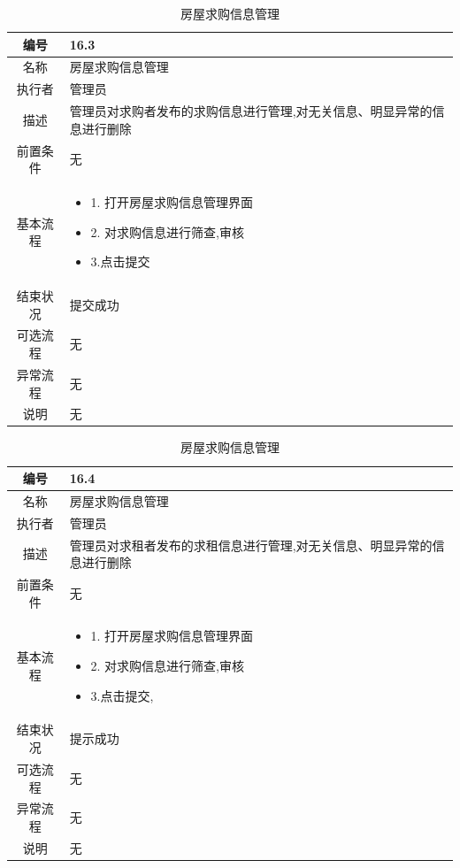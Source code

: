\begin{table}[htbp]
	\centering
	\begin{tabular}{|c|p{11cm}|}
        \hline
        编号 & 16.3 \\
        \hline
        名称 & 房屋求购信息管理 \\ 
        \hline
        执行者 & 管理员 \\
        \hline
        描述 & 管理员对求购者发布的求购信息进行管理,对无关信息、明显异常的信息进行删除 \\
        \hline
        前置条件 & 无 \\
        \hline
        基本流程 & \begin{itemize}
            \item 1. 打开房屋求购信息管理界面
            \item  2. 对求购信息进行筛查,审核
            \item  3.点击提交
        \end{itemize} \\
        \hline
        结束状况 & 提交成功 \\
        \hline
        可选流程 & 无 \\
        \hline
        异常流程 & 无 \\
        \hline
        说明 & 无 \\
        \hline
    \end{tabular}
    \caption{房屋求购信息管理}
\end{table}

\begin{table}[htbp]
	\centering
	\begin{tabular}{|c|p{11cm}|}
        \hline
        编号 & 16.4 \\
        \hline
        名称 & 房屋求购信息管理 \\ 
        \hline
        执行者 & 管理员 \\
        \hline
        描述 & 管理员对求租者发布的求租信息进行管理,对无关信息、明显异常的信息进行删除\\
        \hline
        前置条件 & 无 \\
        \hline
        基本流程 & \begin{itemize}
            \item 1. 打开房屋求购信息管理界面
            \item 2. 对求购信息进行筛查,审核
            \item 3.点击提交, 
        \end{itemize} \\
        \hline
        结束状况 & 提示成功 \\
        \hline
        可选流程 & 无 \\
        \hline
        异常流程 & 无 \\
        \hline
        说明 & 无 \\
        \hline
    \end{tabular}
    \caption{房屋求购信息管理}
\end{table}

